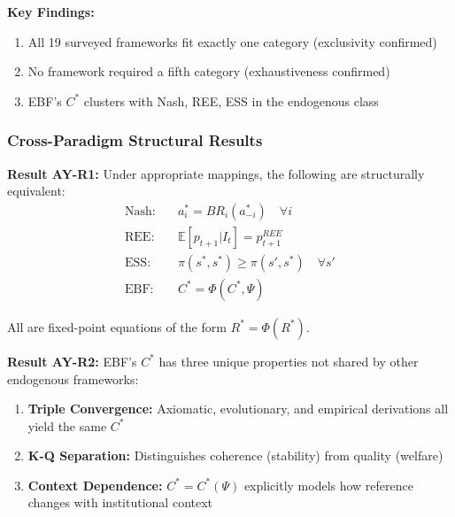 \textbf{Key Findings:}
\begin{enumerate}[nosep]
    \item All 19 surveyed frameworks fit exactly one category (exclusivity confirmed)
    \item No framework required a fifth category (exhaustiveness confirmed)
    \item EBF's $C^*$ clusters with Nash, REE, ESS in the endogenous class
\end{enumerate}

\subsubsection{Cross-Paradigm Structural Results}

\begin{tcolorbox}[colback=green!5!white, colframe=green!75!black,
    title=\textbf{Key Result: Endogenous Equivalence}]

\textbf{Result AY-R1:} Under appropriate mappings, the following are structurally equivalent:
\begin{align}
\text{Nash:} \quad & a_i^* = BR_i(a_{-i}^*) \quad \forall i \\
\text{REE:} \quad & \mathbb{E}[p_{t+1} | I_t] = p_{t+1}^{REE} \\
\text{ESS:} \quad & \pi(s^*, s^*) \geq \pi(s', s^*) \quad \forall s' \\
\text{EBF:} \quad & C^* = \Phi(C^*, \Psi)
\end{align}

All are fixed-point equations of the form $R^* = \Phi(R^*)$.

\end{tcolorbox}

\begin{tcolorbox}[colback=blue!5!white, colframe=blue!75!black,
    title=\textbf{Key Result: EBF Distinctive Features}]

\textbf{Result AY-R2:} EBF's $C^*$ has three unique properties not shared by
other endogenous frameworks:
\begin{enumerate}[nosep]
    \item \textbf{Triple Convergence:} Axiomatic, evolutionary, and empirical
          derivations all yield the same $C^*$
    \item \textbf{K-Q Separation:} Distinguishes coherence (stability) from
          quality (welfare)
    \item \textbf{Context Dependence:} $C^* = C^*(\Psi)$ explicitly models how
          reference changes with institutional context
\end{enumerate}

\end{tcolorbox}


